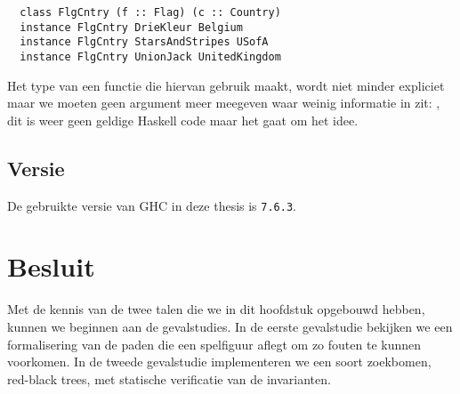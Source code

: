 \begin{verbatim}
  class FlgCntry (f :: Flag) (c :: Country)
  instance FlgCntry DrieKleur Belgium
  instance FlgCntry StarsAndStripes USofA
  instance FlgCntry UnionJack UnitedKingdom
\end{verbatim}

Het type van een functie die hiervan gebruik maakt, wordt niet minder expliciet
maar we moeten geen argument meer meegeven waar weinig informatie in zit:
, dit is weer geen geldige
Haskell code maar het gaat om het idee.

\subsection{Versie}

De gebruikte versie van GHC in deze thesis is \texttt{7.6.3}.


\section{Besluit}

Met de kennis van de twee talen die we in dit hoofdstuk opgebouwd hebben,
kunnen we beginnen aan de gevalstudies. In de eerste gevalstudie bekijken we
een formalisering van de paden die een spelfiguur aflegt om zo fouten te kunnen
voorkomen. In de tweede gevalstudie implementeren we een soort zoekbomen,
red-black trees, met statische verificatie van de invarianten.
